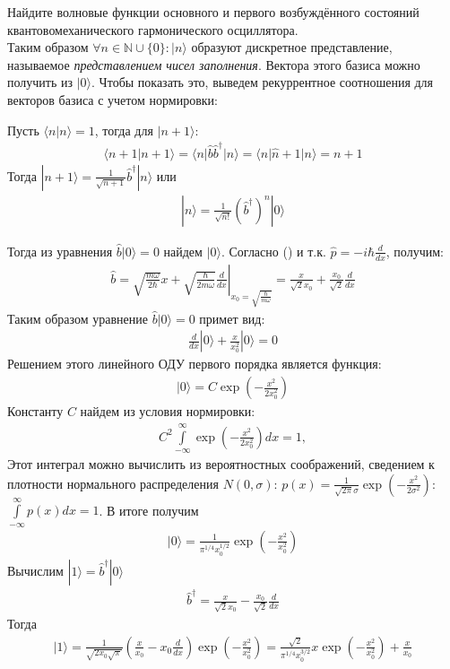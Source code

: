 \documentclass[__main__.tex]{subfiles}
\begin{document}
Найдите волновые функции основного и первого возбуждённого состояний квантовомеханического гармонического осциллятора.\\ 

	
	Таким образом $\forall n\in\mathbb{N}\cup\{0\}\colon|n\rangle$ образуют дискретное представление, называемое \textit{представлением чисел заполнения}. Вектора этого базиса можно получить из $|0\rangle$. Чтобы показать это, выведем рекуррентное соотношения для векторов базиса с учетом нормировки:
	
	Пусть $\langle n|n\rangle=1$, тогда для $|n+1\rangle$:
	\begin{gather*}
	\langle n+1|n+1\rangle = \langle n|\hat{b}\hat{b}^\dagger|n\rangle = \langle n|\hat{n}+1|n\rangle
	= n+1
	\end{gather*}
	Тогда $|n+1\rangle = \frac{1}{\sqrt{n+1}}\hat{b}^\dagger|n\rangle$ или
	\begin{gather*}
	|n\rangle = \frac{1}{\sqrt{n!}}\left(\hat{b}^\dagger\right)^n|0\rangle
	\end{gather*}
	
	Тогда из уравнения $\hat{b}|0\rangle = 0$ найдем $|0\rangle$. Согласно () и т.к. $\hat{p}=-i\hbar\frac{d}{dx}$, получим:
	\begin{gather*}
	\hat{b}
	=
	\left.
	\sqrt{\frac{m\omega}{2\hbar}}x+\sqrt{\frac{\hbar}{2m\omega}}\frac{d}{dx}
	\right|_{x_0=\sqrt{\frac{\hbar}{m\omega}}}
	=
	\frac{x}{\sqrt{2}x_0}+\frac{x_0}{\sqrt{2}}\frac{d}{dx}
	\end{gather*}
	Таким образом уравнение $\hat{b}|0\rangle = 0$ примет вид:
	\begin{gather*}
	\frac{d}{dx}|0\rangle + \frac{x}{x_0^2}|0\rangle = 0
	\end{gather*}
	Решением этого линейного ОДУ первого порядка является функция:
	\begin{gather*}
	|0\rangle = C\exp\left(-\frac{x^2}{2x_0^2}\right)
	\end{gather*}
	Константу $C$ найдем из условия нормировки:
	\begin{gather*}
	C^2\int\limits_{-\infty}^{\infty}\exp\left(-\frac{x^2}{2x_0^2}\right)dx=1,
	\end{gather*}
	Этот интеграл можно вычислить из вероятностных соображений, сведением к плотности нормального распределения $N(0,\sigma)$: $p(x)=\frac{1}{\sqrt{2\pi}\sigma}\exp\left(-\frac{x^2}{2\sigma^2}\right)$: $\int\limits_{-\infty}^{\infty}p(x)dx=1$.
	В итоге получим
	\begin{gather*}
	|0\rangle = \frac{1}{\pi^{1/4}x_0^{1/2}}\exp\left(-\frac{x^2}{x_0^2}\right)
	\end{gather*}
	Вычислим $|1\rangle = \hat{b}^\dagger|0\rangle$
	\begin{gather*}
	\hat{b}^\dagger
	=
	\frac{x}{\sqrt{2}x_0}-\frac{x_0}{\sqrt{2}}\frac{d}{dx}
	\end{gather*}
	Тогда
	\begin{gather*}
	|1\rangle
	=
	\frac{1}{\sqrt{2x_0\sqrt{\pi}}}\left(\frac{x}{x_0}-x_0\frac{d}{dx}\right)\exp\left(-\frac{x^2}{x_0^2}\right)
	=
	\frac{\sqrt{2}}{\pi^{1/4}x_0^{3/2}}x\exp\left(-\frac{x^2}{x_0^2}\right) + \frac{x}{x_0}
	\end{gather*}
	
\end{document}
